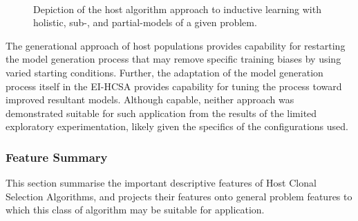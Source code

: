 \begin{figure}[htp]
{\begin{minipage}[t]{0.30\textwidth}
	\end{minipage}}%
	\hfill
		\\
	\caption{Depiction of the host algorithm approach to inductive learning with holistic, sub-, and partial-models of a given problem.}
	\label{fig:mapping:host:models} %
\end{figure}

The generational approach of host populations provides capability for restarting the model generation process that may remove specific training biases by using varied starting conditions. Further, the adaptation of the model generation process itself in the EI-HCSA provides capability for tuning the process toward improved resultant models. Although capable, neither approach was demonstrated suitable for such application from the results of the limited exploratory experimentation, likely given the specifics of the configurations used.

%
%
\subsubsection{Feature Summary}
This section summarise the important descriptive features of Host Clonal Selection Algorithms, and projects their features onto general problem features to which this class of algorithm may be suitable for application.

